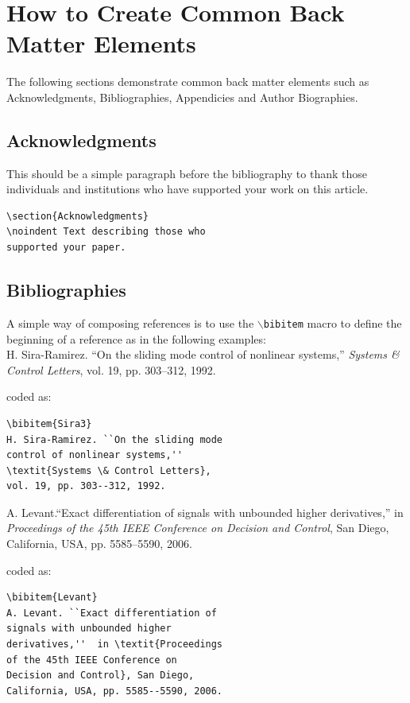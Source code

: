 \documentclass[lettersize,journal]{IEEEtran}
\begin{document}
\section{How to Create Common Back Matter Elements}
\noindent The following sections demonstrate common back matter elements such as Acknowledgments, Bibliographies, Appendicies and Author Biographies.

\subsection{Acknowledgments}
\noindent This should be a simple paragraph before the bibliography to thank those individuals and institutions who have supported your work on this article.

\begin{verbatim}
\section{Acknowledgments}
\noindent Text describing those who 
supported your paper.
\end{verbatim}

\subsection{Bibliographies}
 A simple way of composing references is to use the $\backslash${\tt{bibitem}} macro to define the beginning of a reference as in the following examples:\\


\noindent [6] H. Sira-Ramirez. ``On the sliding mode control of nonlinear systems,'' \textit{Systems \& Control Letters}, vol. 19, pp. 303--312, 1992.

\noindent coded as:
\begin{verbatim}
\bibitem{Sira3}
H. Sira-Ramirez. ``On the sliding mode 
control of nonlinear systems,'' 
\textit{Systems \& Control Letters}, 
vol. 19, pp. 303--312, 1992.
\end{verbatim}

\noindent [7] A. Levant.``Exact differentiation of signals with unbounded higher derivatives,''  in \textit{Proceedings of the 45th IEEE Conference on Decision and Control}, San Diego, California, USA, pp. 5585--5590, 2006.

\noindent coded as:
\begin{verbatim}\bibitem{Levant}
A. Levant. ``Exact differentiation of 
signals with unbounded higher 
derivatives,''  in \textit{Proceedings 
of the 45th IEEE Conference on 
Decision and Control}, San Diego, 
California, USA, pp. 5585--5590, 2006.
\end{verbatim}
\end{document}
